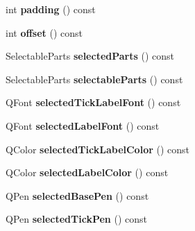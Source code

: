 \begin{DoxyCompactItemize}
\item 
int {\bfseries padding} () const \hypertarget{class_q_c_p_axis_abb85015a9467ec176e70698307ec833a}{}\label{class_q_c_p_axis_abb85015a9467ec176e70698307ec833a}

\item 
int {\bfseries offset} () const \hypertarget{class_q_c_p_axis_aebc032ac6eea164a02859c017f52d5e7}{}\label{class_q_c_p_axis_aebc032ac6eea164a02859c017f52d5e7}

\item 
Selectable\+Parts {\bfseries selected\+Parts} () const \hypertarget{class_q_c_p_axis_a08323248a1cba4750ef07ceea159e0b3}{}\label{class_q_c_p_axis_a08323248a1cba4750ef07ceea159e0b3}

\item 
Selectable\+Parts {\bfseries selectable\+Parts} () const \hypertarget{class_q_c_p_axis_ad2bff3d2ed3d35c10d44c0c02441bd2c}{}\label{class_q_c_p_axis_ad2bff3d2ed3d35c10d44c0c02441bd2c}

\item 
Q\+Font {\bfseries selected\+Tick\+Label\+Font} () const \hypertarget{class_q_c_p_axis_ae245bb3dcd0ec71eee38437de6e719f7}{}\label{class_q_c_p_axis_ae245bb3dcd0ec71eee38437de6e719f7}

\item 
Q\+Font {\bfseries selected\+Label\+Font} () const \hypertarget{class_q_c_p_axis_a078bbc88b33595a5308350c2889c96d4}{}\label{class_q_c_p_axis_a078bbc88b33595a5308350c2889c96d4}

\item 
Q\+Color {\bfseries selected\+Tick\+Label\+Color} () const \hypertarget{class_q_c_p_axis_a5a3af4bd1a820bb7c6d4c85e1d8d452f}{}\label{class_q_c_p_axis_a5a3af4bd1a820bb7c6d4c85e1d8d452f}

\item 
Q\+Color {\bfseries selected\+Label\+Color} () const \hypertarget{class_q_c_p_axis_a8cf8de6ac7f1ca617e05412f669ed229}{}\label{class_q_c_p_axis_a8cf8de6ac7f1ca617e05412f669ed229}

\item 
Q\+Pen {\bfseries selected\+Base\+Pen} () const \hypertarget{class_q_c_p_axis_a5a3919ad7b60c2789b04c7e72387cfd6}{}\label{class_q_c_p_axis_a5a3919ad7b60c2789b04c7e72387cfd6}

\item 
Q\+Pen {\bfseries selected\+Tick\+Pen} () const \hypertarget{class_q_c_p_axis_a9f86ef82e1d1a908ab4c68cfa5fe4175}{}\label{class_q_c_p_axis_a9f86ef82e1d1a908ab4c68cfa5fe4175}


\end{DoxyCompactItemize}

